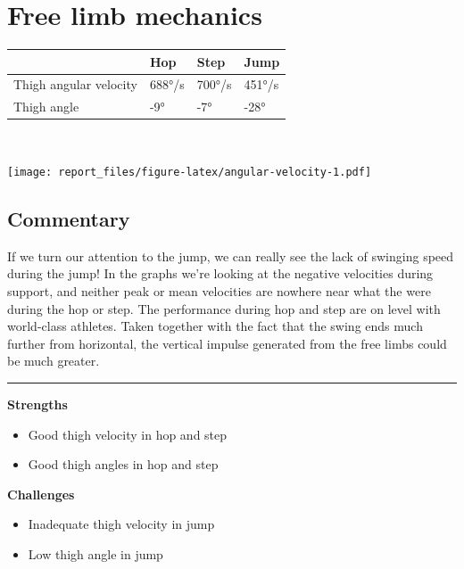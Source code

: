 \documentclass[]{scrreprt}
\providecommand{\tightlist}{%
  \setlength{\itemsep}{0pt}\setlength{\parskip}{0pt}}
\begin{document}
\hypertarget{free-limb-mechanics-1}{%
\section{Free limb mechanics}\label{free-limb-mechanics-1}}

\begin{table}[H]
\centering
\begin{tabular}{l|l|l|l}
\hline
  & Hop & Step & Jump\\
\hline
Thigh angular velocity & 688°/s & 700°/s & 451°/s\\
\hline
Thigh angle & -9° & -7° & -28°\\
\hline
\end{tabular}
\end{table}

~

\texttt{[image: report\_files/figure-latex/angular-velocity-1.pdf]}
~

\hypertarget{commentary-3}{%
\subsection{Commentary}\label{commentary-3}}

If we turn our attention to the jump, we can really see the lack of swinging speed during the jump! In the graphs we're looking at the negative velocities during support, and neither peak or mean velocities are nowhere near what the were during the hop or step. The performance during hop and step are on level with world-class athletes. Taken together with the fact that the swing ends much further from horizontal, the vertical impulse generated from the free limbs could be much greater.

\begin{center}\rule{0.5\linewidth}{0.5pt}\end{center}

\textbf{Strengths}

\begin{itemize}
\tightlist
\item
  Good thigh velocity in hop and step
\item
  Good thigh angles in hop and step
\end{itemize}

\textbf{Challenges}

\begin{itemize}
\tightlist
\item
  Inadequate thigh velocity in jump
\item
  Low thigh angle in jump
\end{itemize}
\end{document}
